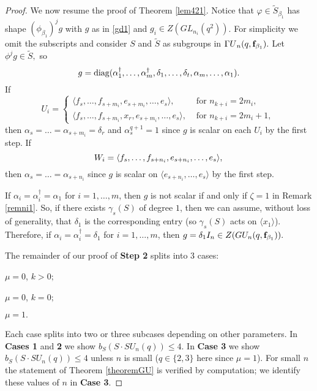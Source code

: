 \begin{proof}
We now resume the proof of Theorem \ref{lem421}. 
 Notice that $\varphi \in \tilde{S}_{\beta_1}$ has shape $(\phi_{\beta_1})^jg$ with $g$ as in \eqref{gd1} and $g_i \in Z(GL_{n_i}(q^2))$. For simplicity we omit the subscripts and consider $S$ and $\tilde{S}$ as subgroups in ${{\Gamma U}}_n(q, {\bf f}_{\beta_1}).$ Let $\phi^jg \in \tilde{S},$ so 
\begin{equation}\label{gdiag}
g=\mathrm{diag}(\alpha_1^{\dagger}, \ldots,  \alpha_m^{\dagger},\delta_1, \ldots, \delta_t, \alpha_m, \ldots, \alpha_1).
\end{equation}
If 
 \begin{equation*}
 U_i =
\begin{cases} 
\langle f_s, \ldots, f_{s+m_i}, e_{s+m_i}, \ldots, e_s\rangle, & \text{ for $n_{k+i}=2m_i$},  \\
\langle f_s, \ldots, f_{s+m_i}, x_r, e_{s+m_i}, \ldots, e_s\rangle, & \text{ for $n_{k+i}=2m_i+1$, } 
\end{cases}
\end{equation*}
 then  $\alpha_s= \ldots =\alpha_{s+m_i}=\delta_r$  and  $\alpha_s^{q+1}=1$ since $g$ is scalar on each $U_i$ by the first step. 
If 
 \begin{equation}\label{Weq}
 W_i = 
\langle f_s, \ldots, f_{s+n_i}, e_{s+n_i}, \ldots, e_s\rangle,   \\
\end{equation}
 then  $\alpha_s= \ldots =\alpha_{s+n_i}$ since $g$ is scalar on  $ \langle e_{s+n_i}, \ldots, e_s\rangle$ by the first step.




\begin{Rem}\label{x1} %
 If  $\alpha_i=\alpha_i^{\dagger}=\alpha_1$ for $i=1, \ldots, m$, then $g$ is not scalar if and only if ${\zeta}=1$ in Remark \ref{remni1}. So, if there exists $\gamma_s(S)$ of degree $1$, then we can assume, without loss of generality, that $\delta_1$ is the corresponding entry (so $\gamma_s(S)$ acts on $\langle x_1\rangle$). Therefore, if  $\alpha_i=\alpha_i^{\dagger}=\delta_1$ for $i=1, \ldots, m$, then $g=\delta_1 I_n \in Z(GU_n(q,{\bf f}_{\beta_1})).$ 
\end{Rem}





The remainder of our proof of {\bf Step 2} splits into 3 cases:
\begin{description}[before={\renewcommand\makelabel[1]{\bfseries ##1}}]
\item[{\bf Case 1.}] $\mu=0$, $k>0;$
\item[{\bf Case 2.}] $\mu=0$, $k=0;$
\item[{\bf Case 3.}] $\mu=1.$
\end{description}
Each case splits into two or three subcases depending on other parameters. In  {\bf Cases 1} and {\bf 2} we show $b_S(S \cdot SU_n(q))\le 4.$ In  {\bf Case 3} we show  $b_S(S \cdot SU_n(q))\le 4$ unless $n$ is small ($q \in \{2,3\}$ here since $\mu=1$). For small $n$ the statement of Theorem \ref{theoremGU} is verified by computation; we identify these values of $n$ in {\bf Case 3}.



\end{proof}

